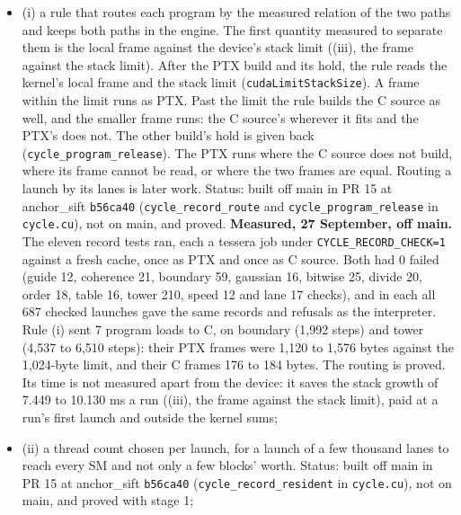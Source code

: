\begin{enumerate}
\begin{itemize}
\begin{enumerate}
\begin{itemize}
\item (i) a rule that routes each program by the measured relation of the two paths and keeps both paths in the engine. The first quantity measured to separate them is the local frame against the device's stack limit ((iii), the frame against the stack limit). After the PTX build and its hold, the rule reads the kernel's local frame and the stack limit (\texttt{cudaLimitStackSize}). A frame within the limit runs as PTX. Past the limit the rule builds the C source as well, and the smaller frame runs: the C source's wherever it fits and the PTX's does not. The other build's hold is given back (\texttt{cycle\_\allowbreak{}program\_\allowbreak{}release}). The PTX runs where the C source does not build, where its frame cannot be read, or where the two frames are equal. Routing a launch by its lanes is later work. Status: built off main in PR 15 at anchor\_\allowbreak{}sift \texttt{b56ca40} (\texttt{cycle\_\allowbreak{}record\_\allowbreak{}route} and \texttt{cycle\_\allowbreak{}program\_\allowbreak{}release} in \texttt{cycle.\allowbreak{}cu}), not on main, and proved. \textbf{Measured, 27 September, off main.} The eleven record tests ran, each a tessera job under \texttt{CYCLE\_\allowbreak{}RECORD\_\allowbreak{}CHECK=1} against a fresh cache, once as PTX and once as C source. Both had 0 failed (guide 12, coherence 21, boundary 59, gaussian 16, bitwise 25, divide 20, order 18, table 16, tower 210, speed 12 and lane 17 checks), and in each all 687 checked launches gave the same records and refusals as the interpreter. Rule (i) sent 7 program loads to C, on boundary (1,992 steps) and tower (4,537 to 6,510 steps): their PTX frames were 1,120 to 1,576 bytes against the 1,024-byte limit, and their C frames 176 to 184 bytes. The routing is proved. Its time is not measured apart from the device: it saves the stack growth of 7.449 to 10.130 ms a run ((iii), the frame against the stack limit), paid at a run's first launch and outside the kernel sums;
\item (ii) a thread count chosen per launch, for a launch of a few thousand lanes to reach every SM and not only a few blocks' worth. Status: built off main in PR 15 at anchor\_\allowbreak{}sift \texttt{b56ca40} (\texttt{cycle\_\allowbreak{}record\_\allowbreak{}resident} in \texttt{cycle.\allowbreak{}cu}), not on main, and proved with stage 1;


\end{itemize}
\end{enumerate}
\end{itemize}
\end{enumerate}
